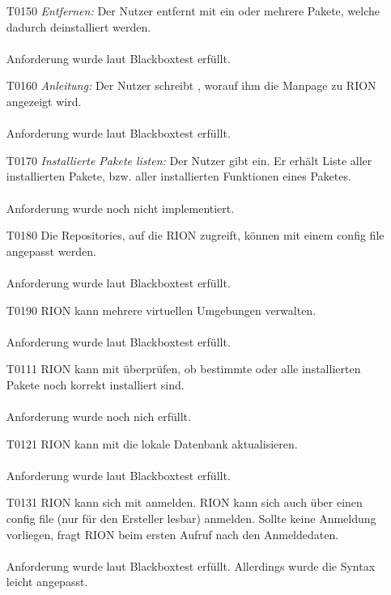 \begin{itemize}
	\item[T0150] \textit{Entfernen:} Der Nutzer entfernt mit  ein oder mehrere Pakete, welche dadurch deinstalliert werden.\\\\
	Anforderung wurde laut Blackboxtest erfüllt.
	\item[T0160] \textit{Anleitung:} Der Nutzer schreibt , worauf ihm die Manpage zu RION angezeigt wird.\\\\
		Anforderung wurde laut Blackboxtest erfüllt.
	\item[T0170] \textit{Installierte Pakete listen:} Der Nutzer gibt  ein. Er erhält Liste aller installierten Pakete, bzw. aller installierten Funktionen eines Paketes.\\\\
		Anforderung wurde noch nicht implementiert.
	\item[T0180] Die Repositories, auf die RION zugreift, können mit einem config file angepasst werden.\\\\
		Anforderung wurde laut Blackboxtest erfüllt.
	\item[T0190] RION kann mehrere virtuellen Umgebungen verwalten.\\\\
		Anforderung wurde laut Blackboxtest erfüllt.
	\item[T0111] RION kann mit 	 überprüfen, ob bestimmte oder alle installierten Pakete noch korrekt installiert sind.\\\\
		Anforderung wurde noch nich erfüllt.
	\item[T0121] RION kann mit  die lokale Datenbank aktualisieren.\\\\
		Anforderung wurde laut Blackboxtest erfüllt.
	\item[T0131] RION kann sich mit  anmelden. RION kann sich auch über einen config file (nur für den Ersteller lesbar) anmelden. Sollte keine Anmeldung vorliegen, fragt RION beim ersten Aufruf nach den Anmeldedaten.\\\\
	Anforderung wurde laut Blackboxtest erfüllt. Allerdings wurde die Syntax leicht angepasst.
\end{itemize}
